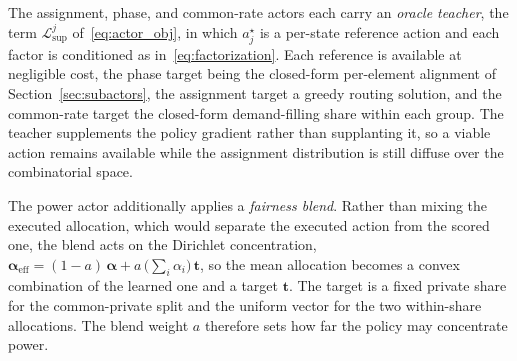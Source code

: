 \documentclass[12pt,onecolumn]{IEEEtran}
\begin{document}
The assignment, phase, and common-rate actors each carry an \emph{oracle teacher}, the term $\mathcal{L}^{j}_{\mathrm{sup}}$ of~\eqref{eq:actor_obj}, in which $a_j^{\star}$ is a per-state reference action and each factor is conditioned as in~\eqref{eq:factorization}.
Each reference is available at negligible cost, the phase target being the closed-form per-element alignment of Section~\ref{sec:subactors}, the assignment target a greedy routing solution, and the common-rate target the closed-form demand-filling share within each group.
The teacher supplements the policy gradient rather than supplanting it, so a viable action remains available while the assignment distribution is still diffuse over the combinatorial space.

The power actor additionally applies a \emph{fairness blend}.
Rather than mixing the executed allocation, which would separate the executed action from the scored one, the blend acts on the Dirichlet concentration, $\boldsymbol{\alpha}_{\mathrm{eff}} = (1-a)\,\boldsymbol{\alpha} + a\,\bigl(\textstyle\sum_i \alpha_i\bigr)\,\mathbf{t}$, so the mean allocation becomes a convex combination of the learned one and a target $\mathbf{t}$.
The target is a fixed private share for the common-private split and the uniform vector for the two within-share allocations.
The blend weight $a$ therefore sets how far the policy may concentrate power.
\end{document}
